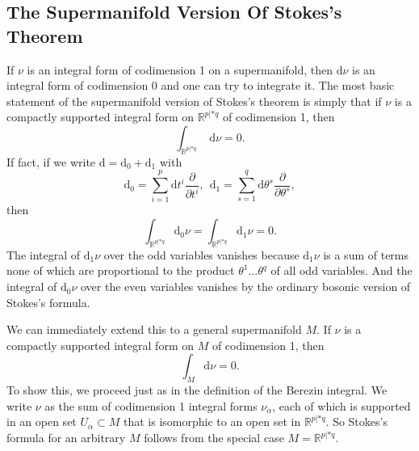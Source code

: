 \documentclass[11pt,a4paper]{article}
\def\d{{\mathrm d}}
\def\R{{\mathbb R}}
\begin{document}
\subsection{The Supermanifold Version Of Stokes's Theorem}\label{stokes}



If $\nu$ is an integral form of codimension 1 on a supermanifold, then $\d\nu$ is an integral form of codimension 0 and one can try to integrate it.
The most basic statement of the supermanifold version of Stokes's theorem is simply that if $\nu$ is a compactly supported integral form on $\R^{p|*q}$ of codimension 1,
then
\begin{equation}\label{ubint}\int_{\R^{p|*q}} \,\,\d \nu=0.  \end{equation}
If fact, if we write $\d=\d_0+\d_1$ with
\begin{equation}\label{bint}\d_0=\sum_{i=1}^p\d t^i\frac{\partial}{\partial t^i},~~  \d_1=\sum_{s=1}^q\d\theta^s\frac{\partial}{\partial\theta^s},\end{equation}
then 
\begin{equation}\label{nuint}\int_{\R^{p|*q}}\d_0\nu= \int_{\R^{p|*q}}\d_1\nu=0. \end{equation}
The integral of  $\d_1\nu$ over the odd variables 
vanishes because  $\d_1\nu$ is a sum of terms none of which are proportional to the product $\theta^1\dots\theta^q$ of all odd variables.    And the integral of $\d_0\nu$ over the even
variables vanishes by the ordinary bosonic version of Stokes's formula.  

We can immediately extend this to a general supermanifold $M$.  If $\nu$ is a compactly supported integral form on $M$ of codimension 1, then
\begin{equation}\label{zeof}\int_M\d\nu=0. \end{equation}
To show this, we proceed just as in the definition of the Berezin integral.  We write $\nu$ as the sum of codimension 1 integral forms $\nu_\alpha$,
each of which is supported in an open set $U_\alpha\subset M$ that is isomorphic to an open set in $\R^{p|*q}$.  So  Stokes's formula for an arbitrary $M$
follows from the special case $M=\R^{p|*q}$.
\end{document}

